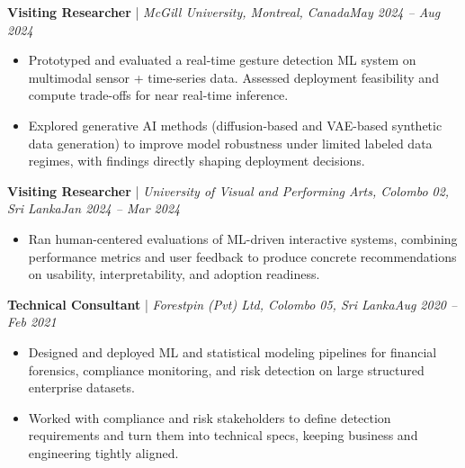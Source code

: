 \documentclass[11pt]{article}
\newenvironment{cvrole}[5]{%
  \par\noindent\textbf{\large #1} | \textit{\small #2, #3}\hfill \textit{\small #4 -- #5}\par
  \begin{itemize}[leftmargin=2em, itemsep=-0.3em, topsep=-0.5em]%
}{%
  \end{itemize}\par\noindent\mbox{}\par\vspace{0.1em}%
}
\begin{document}
\begin{cvrole}{Visiting Researcher}{McGill University}{Montreal, Canada}{May 2024}{Aug 2024}
    \item Prototyped and evaluated a real-time gesture detection ML system on multimodal sensor + time-series data. Assessed deployment feasibility and compute trade-offs for near real-time inference.
    \item Explored generative AI methods (diffusion-based and VAE-based synthetic data generation) to improve model robustness under limited labeled data regimes, with findings directly shaping deployment decisions.
\end{cvrole}

\begin{cvrole}{Visiting Researcher}{University of Visual and Performing Arts}{Colombo 02, Sri Lanka}{Jan 2024}{Mar 2024}
    \item Ran human-centered evaluations of ML-driven interactive systems, combining performance metrics and user feedback to produce concrete recommendations on usability, interpretability, and adoption readiness.
\end{cvrole}

\begin{cvrole}{Technical Consultant}{Forestpin (Pvt) Ltd}{Colombo 05, Sri Lanka}{Aug 2020}{Feb 2021}
    \item Designed and deployed ML and statistical modeling pipelines for financial forensics, compliance monitoring, and risk detection on large structured enterprise datasets.
    \item Worked with compliance and risk stakeholders to define detection requirements and turn them into technical specs, keeping business and engineering tightly aligned.
\end{cvrole}
\end{document}
